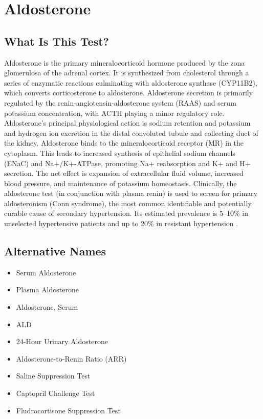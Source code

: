 \chapter{Aldosterone}

\section*{What Is This Test?}
Aldosterone is the primary mineralocorticoid hormone produced by the zona glomerulosa of the adrenal cortex. It is synthesized from cholesterol through a series of enzymatic reactions culminating with aldosterone synthase (CYP11B2), which converts corticosterone to aldosterone. Aldosterone secretion is primarily regulated by the renin-angiotensin-aldosterone system (RAAS) and serum potassium concentration, with ACTH playing a minor regulatory role. Aldosterone's principal physiological action is sodium retention and potassium and hydrogen ion excretion in the distal convoluted tubule and collecting duct of the kidney. Aldosterone binds to the mineralocorticoid receptor (MR) in the cytoplasm. This leads to increased synthesis of epithelial sodium channels (ENaC) and Na+/K+-ATPase, promoting Na+ reabsorption and K+ and H+ secretion. The net effect is expansion of extracellular fluid volume, increased blood pressure, and maintenance of potassium homeostasis. Clinically, the aldosterone test (in conjunction with plasma renin) is used to screen for primary aldosteronism (Conn syndrome), the most common identifiable and potentially curable cause of secondary hypertension. Its estimated prevalence is 5--10\% in unselected hypertensive patients and up to 20\% in resistant hypertension \cite{monticone2017prevalence}.

\section*{Alternative Names}
\begin{itemize}
  \item Serum Aldosterone
  \item Plasma Aldosterone
  \item Aldosterone, Serum
  \item ALD
  \item 24-Hour Urinary Aldosterone
  \item Aldosterone-to-Renin Ratio (ARR)
  \item Saline Suppression Test
  \item Captopril Challenge Test
  \item Fludrocortisone Suppression Test
\end{itemize}
